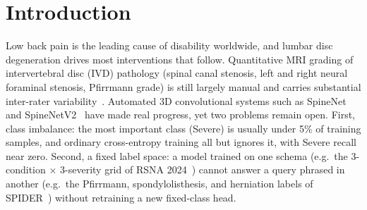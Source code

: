 \documentclass[runningheads]{llncs}
\begin{document}
\section{Introduction}\label{sec1}

Low back pain is the leading cause of disability worldwide, and lumbar disc degeneration drives most interventions that follow. Quantitative MRI grading of intervertebral disc (IVD) pathology (spinal canal stenosis, left and right neural foraminal stenosis, Pfirrmann grade) is still largely manual and carries substantial inter-rater variability~\cite{nigru2024}. Automated 3D convolutional systems such as SpineNet~\cite{jamaludin2017} and SpineNetV2~\cite{windsor2022} have made real progress, yet two problems remain open. First, class imbalance: the most important class (Severe) is usually under 5\% of training samples, and ordinary cross-entropy training all but ignores it, with Severe recall near zero. Second, a fixed label space: a model trained on one schema (e.g.\ the 3-condition $\times$ 3-severity grid of RSNA 2024~\cite{kaggle2024}) cannot answer a query phrased in another (e.g.\ the Pfirrmann, spondylolisthesis, and herniation labels of SPIDER~\cite{vandergraaf2024spider}) without retraining a new fixed-class head.
\end{document}
